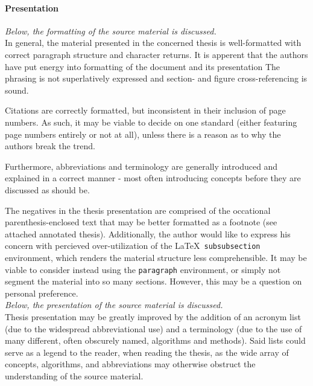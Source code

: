 
\paragraph{Presentation}
\textit{Below, the formatting of the source material is discussed.}\\

\noindent
In general, the material presented in the concerned thesis is well-formatted with correct paragraph structure and character returns.
It is apperent that the authors have put energy into formatting of the document and its presentation
The phrasing is not superlatively expressed and section- and figure cross-referencing is sound.

Citations are correctly formatted, but inconsistent in their inclusion of page numbers.
As such, it may be viable to decide on one standard (either featuring page numbers entirely or not at all), unless there is a reason as to why the authors break the trend.

Furthermore, abbreviations and terminology are generally introduced and explained in a correct manner - most often introducing concepts before they are discussed as should be.

The negatives in the thesis presentation are comprised of the occational parenthesis-enclosed text that may be better formatted as a footnote (see attached annotated thesis).
Additionally, the author would like to express his concern with percieved over-utilization of the \LaTeX\ \texttt{subsubsection} environment, which renders the material structure less comprehensible.
It may be viable to consider instead using the \texttt{paragraph} environment, or simply not segment the material into so many sections.
However, this may be a question on personal preference.\\

\noindent
\textit{Below, the presentation of the source material is discussed.}\\

\noindent
Thesis presentation may be greatly improved by the addition of an acronym list (due to the widespread abbreviational use) and a terminology (due to the use of many different, often obscurely named, algorithms and methods).
Said lists could serve as a legend to the reader, when reading the thesis, as the wide array of concepts, algorithms, and abbreviations may otherwise obstruct the understanding of the source material.